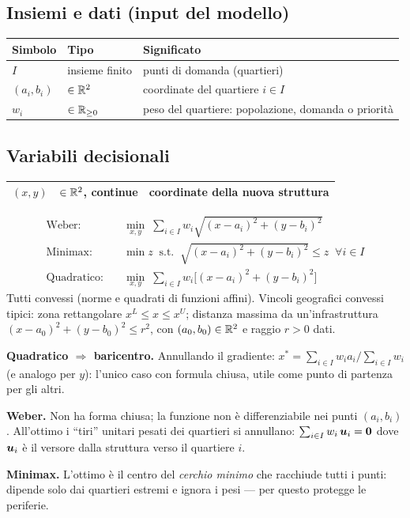 \subsection*{Insiemi e dati (input del modello)}
\begin{center}\small
\begin{tabular}{llp{7.2cm}}
\toprule
Simbolo & Tipo & Significato \\
\midrule
$I$ & insieme finito & punti di domanda (quartieri) \\
$(a_i, b_i)$ & $\in \mathbb{R}^2$ & coordinate del quartiere $i \in I$ \\
$w_i$ & $\in \mathbb{R}_{\ge 0}$ & peso del quartiere: popolazione, domanda o priorità \\
\bottomrule
\end{tabular}
\end{center}

\subsection*{Variabili decisionali}
\begin{center}\small
\begin{tabular}{llp{7.2cm}}
\toprule
$(x, y)$ & $\in \mathbb{R}^2$, continue & coordinate della nuova struttura \\
\bottomrule
\end{tabular}
\end{center}

\begin{modello}
\begin{align*}
\text{Weber:}\quad & \min_{x,y}\; \textstyle\sum_{i \in I} w_i \sqrt{(x-a_i)^2 + (y-b_i)^2}\\
\text{Minimax:}\quad & \min z \;\;\text{s.t.}\;\; \sqrt{(x-a_i)^2 + (y-b_i)^2} \le z \;\;\forall i \in I\\
\text{Quadratico:}\quad & \min_{x,y}\; \textstyle\sum_{i \in I} w_i \bigl[(x-a_i)^2 + (y-b_i)^2\bigr]
\end{align*}
Tutti convessi (norme e quadrati di funzioni affini). Vincoli geografici convessi
tipici: zona rettangolare $x^L \le x \le x^U$; distanza massima da un'infrastruttura
$(x - a_0)^2 + (y - b_0)^2 \le r^2$, con $(a_0, b_0) \in \mathbb{R}^2$ e raggio $r > 0$ dati.
\end{modello}

\begin{spiegazione}
\textbf{Quadratico $\Rightarrow$ baricentro.} Annullando il gradiente:
$x^* = \sum_{i \in I} w_i a_i \big/ \sum_{i \in I} w_i$ (e analogo per $y$): l'unico caso con formula
chiusa, utile come punto di partenza per gli altri.

\textbf{Weber.} Non ha forma chiusa; la funzione non è differenziabile nei punti
$(a_i, b_i)$. All'ottimo i ``tiri'' unitari pesati dei quartieri si annullano:
$\sum_{i \in I} w_i\, \boldsymbol{u}_i = \boldsymbol{0}$ dove $\boldsymbol{u}_i$ è il versore dalla struttura verso il quartiere $i$.

\textbf{Minimax.} L'ottimo è il centro del \emph{cerchio minimo} che racchiude tutti i
punti: dipende solo dai quartieri estremi e ignora i pesi --- per questo protegge le
periferie.
\end{spiegazione}

